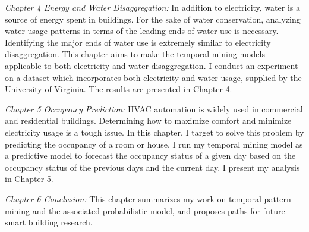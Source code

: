 \textit{Chapter 4 Energy and Water Disaggregation:}
In addition to electricity, water is a source of energy spent in buildings.
For the sake of water conservation, 
analyzing water usage patterns in terms of the leading ends of water use is necessary. 
Identifying the major ends of water use is extremely similar to electricity disaggregation. 
This chapter aims to make the temporal mining models applicable to both electricity 
and water disaggregation. 
I conduct an experiment on a dataset which incorporates both electricity and water usage, 
supplied by the University of Virginia. 
The results are presented in Chapter 4.

\textit{Chapter 5 Occupancy Prediction:}
HVAC automation is widely used in commercial and residential buildings. 
Determining how to maximize comfort and minimize electricity usage is a tough issue. 
In this chapter, I target to solve this problem by predicting the occupancy of a room or house. 
I run my temporal mining model as a predictive model to forecast the occupancy status 
of a given day based on the occupancy status of the previous days and the current day. 
I present my analysis in Chapter 5.

\textit{Chapter 6 Conclusion:} This chapter summarizes my work on temporal pattern mining and the associated probabilistic model, and proposes paths for future smart building research. 




